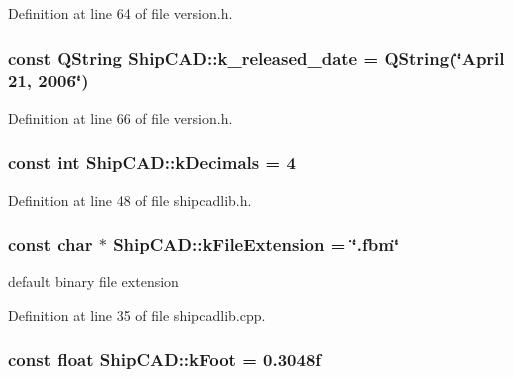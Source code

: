 Definition at line 64 of file version.\+h.

\subsubsection[{\texorpdfstring{k\+\_\+released\+\_\+date}{k_released_date}}]{\setlength{\rightskip}{0pt plus 5cm}const Q\+String Ship\+C\+A\+D\+::k\+\_\+released\+\_\+date = Q\+String(\char`\"{}April 21, 2006\char`\"{})}\hypertarget{namespaceShipCAD_a833fc6d39d2f0fd7fa31d0a691b0b726}{}\label{namespaceShipCAD_a833fc6d39d2f0fd7fa31d0a691b0b726}


Definition at line 66 of file version.\+h.

\subsubsection[{\texorpdfstring{k\+Decimals}{kDecimals}}]{\setlength{\rightskip}{0pt plus 5cm}const int Ship\+C\+A\+D\+::k\+Decimals = 4}\hypertarget{namespaceShipCAD_ac88ffd27e117a3e612997a36a5d4616d}{}\label{namespaceShipCAD_ac88ffd27e117a3e612997a36a5d4616d}


Definition at line 48 of file shipcadlib.\+h.

\subsubsection[{\texorpdfstring{k\+File\+Extension}{kFileExtension}}]{\setlength{\rightskip}{0pt plus 5cm}const char $\ast$ Ship\+C\+A\+D\+::k\+File\+Extension = \char`\"{}.fbm\char`\"{}}\hypertarget{namespaceShipCAD_a6461e4d91e555f0c732b53f8998b325d}{}\label{namespaceShipCAD_a6461e4d91e555f0c732b53f8998b325d}
default binary file extension 

Definition at line 35 of file shipcadlib.\+cpp.

\subsubsection[{\texorpdfstring{k\+Foot}{kFoot}}]{\setlength{\rightskip}{0pt plus 5cm}const float Ship\+C\+A\+D\+::k\+Foot = 0.\+3048f}\hypertarget{namespaceShipCAD_a8c1484188fed1e735c5a94f64a6817ab}{}\label{namespaceShipCAD_a8c1484188fed1e735c5a94f64a6817ab}


